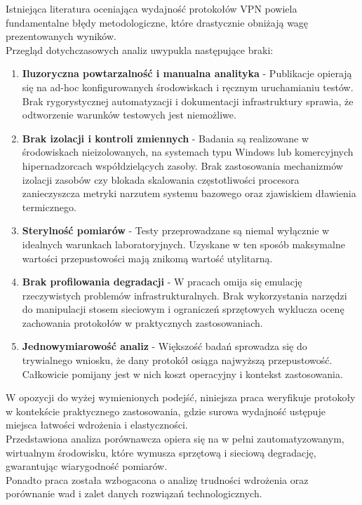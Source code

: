 Istniejąca literatura oceniająca wydajność protokołów VPN powiela fundamentalne błędy metodologiczne, które drastycznie obniżają wagę prezentowanych wyników.\\

Przegląd dotychczasowych analiz uwypukla następujące braki:

\begin{enumerate}[leftmargin=*]
    \item \textbf{Iluzoryczna powtarzalność i manualna analityka} - Publikacje opierają się na ad-hoc konfigurowanych środowiskach i ręcznym uruchamianiu testów. Brak rygorystycznej automatyzacji i dokumentacji infrastruktury sprawia, że odtworzenie warunków testowych jest niemożliwe.

    \item \textbf{Brak izolacji i kontroli zmiennych} - Badania są realizowane w środowiskach nieizolowanych, na systemach typu Windows lub komercyjnych hipernadzorcach współdzielących zasoby. Brak zastosowania mechanizmów izolacji zasobów czy blokada skalowania częstotliwości procesora zanieczyszcza metryki narzutem systemu bazowego oraz zjawiskiem dławienia termicznego.

    \item \textbf{Sterylność pomiarów} - Testy przeprowadzane są niemal wyłącznie w idealnych warunkach laboratoryjnych. Uzyskane w ten sposób maksymalne wartości przepustowości mają znikomą wartość utylitarną.

    \item \textbf{Brak profilowania degradacji} - W pracach omija się emulację rzeczywistych problemów infrastrukturalnych. Brak wykorzystania narzędzi do manipulacji stosem sieciowym i ograniczeń sprzętowych wyklucza ocenę zachowania protokołów w praktycznych zastosowaniach.

    \item \textbf{Jednowymiarowość analiz} - Większość badań sprowadza się do trywialnego wniosku, że dany protokół osiąga najwyższą przepustowość. Całkowicie pomijany jest w nich koszt operacyjny i kontekst zastosowania.
\end{enumerate}

W opozycji do wyżej wymienionych podejść, niniejsza praca weryfikuje protokoły w kontekście praktycznego zastosowania, gdzie surowa wydajność ustępuje miejsca łatwości wdrożenia i elastyczności.\\

Przedstawiona analiza porównawcza opiera się na w pełni zautomatyzowanym, wirtualnym środowisku, które wymusza sprzętową i sieciową degradację, gwarantując wiarygodność pomiarów.\\

Ponadto praca została wzbogacona o analizę trudności wdrożenia oraz porównanie wad i zalet danych rozwiązań technologicznych.